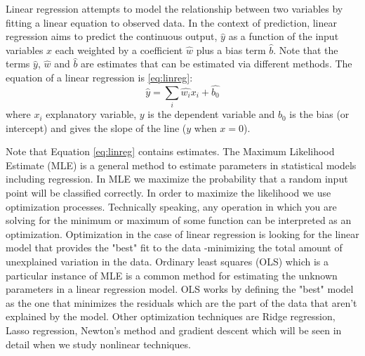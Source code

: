 \documentclass[11pt]{article}
\theoremstyle{definition}
\theoremstyle{remark}
\begin{document}
Linear regression attempts to model the relationship between two variables by fitting a linear equation to observed data. In the context of prediction, linear regression aims to predict the continuous output, $\hat{y}$ as a function of the input variables $x$ each weighted by a coefficient $\hat{w}$ plus a bias term $\hat{b}$. Note that the terms $\hat{y}$, $\hat{w}$ and $\hat{b}$ are estimates that can be estimated via different methods. The equation of a linear regression is \ref{eq:linreg}:
\begin{equation}
\hat{y} = \sum_i \hat{w_i}x_i + \hat{b_0}
\label{eq:linreg}
\end{equation}
where $x_i$ explanatory variable, $y$ is the dependent variable and $b_0$ is the bias (or intercept) and gives the slope of the line ($y$ when $x=0$). 

Note that Equation \ref{eq:linreg} contains estimates. The Maximum Likelihood Estimate (MLE) is a general method to estimate parameters in statistical models including regression. In MLE we maximize the probability that a random input point will be classified correctly. In order to maximize the likelihood we use optimization processes. 
Technically speaking, any operation in which you are solving for the minimum or maximum of some function can be interpreted as an optimization. Optimization in the case of linear regression is looking for the linear model that provides the "best" fit to the data -minimizing the total amount of unexplained variation in the data.
Ordinary least squares (OLS) which is a particular instance of MLE is a common method for estimating the unknown parameters in a linear regression model. OLS works by defining the "best" model as the one that minimizes the residuals which are the part of the data that aren't explained by the model. Other optimization techniques are Ridge regression, Lasso regression, Newton's method and gradient descent which will be seen in detail when we study nonlinear techniques.
\end{document}
